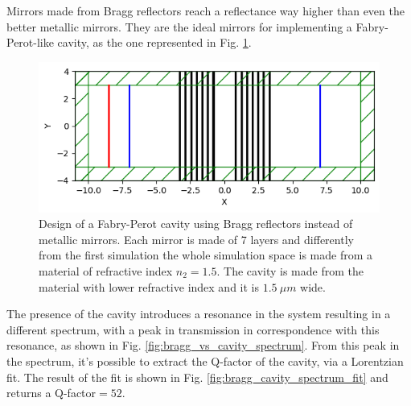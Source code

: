 Mirrors made from Bragg reflectors reach a reflectance way higher than even the better metallic mirrors. They are the ideal mirrors for implementing a Fabry-Perot-like cavity, as the one represented in Fig. \ref{fig:bragg_cavity_design}.

\begin{figure}[H]
    \centering
    \includegraphics[width=0.8\linewidth]{Figures/bragg_cavity_design.png}
    \caption{Design of a Fabry-Perot cavity using Bragg reflectors instead of metallic mirrors. Each mirror is made of 7 layers and differently from the first simulation the whole simulation space is made from a material of refractive index \(n_2 = 1.5\). The cavity is made from the material with lower refractive index and it is \(1.5\ \mu m\) wide.}
    \label{fig:bragg_cavity_design}
\end{figure}

The presence of the cavity introduces a resonance in the system resulting in a different spectrum, with a peak in transmission in correspondence with this resonance, as shown in Fig. \ref{fig:bragg_vs_cavity_spectrum}. From this peak in the spectrum, it's possible to extract the Q-factor of the cavity, via a Lorentzian fit. The result of the fit is shown in Fig. \ref{fig:bragg_cavity_spectrum_fit} and returns a Q-factor\(=52\).

